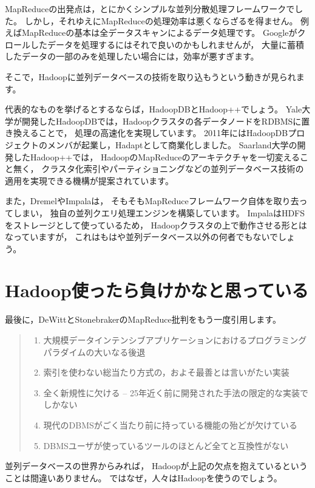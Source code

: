 MapReduceの出発点は，とにかくシンプルな並列分散処理フレームワークでした。
しかし，それゆえにMapReduceの処理効率は悪くならざるを得ません。
例えばMapReduceの基本は全データスキャンによるデータ処理です。
Googleがクロールしたデータを処理するにはそれで良いのかもしれませんが，
大量に蓄積したデータの一部のみを処理したい場合には，効率が悪すぎます。

そこで，Hadoopに並列データベースの技術を取り込もうという動きが見られます。

代表的なものを挙げるとするならば，HadoopDBとHadoop++でしょう。
Yale大学が開発したHadoopDBでは，Hadoopクラスタの各データノードをRDBMSに置き換えることで，
処理の高速化を実現しています。
2011年にはHadoopDBプロジェクトのメンバが起業し，Hadaptとして商業化しました。
Saarland大学の開発したHadoop++では，
HadoopのMapReduceのアーキテクチャを一切変えること無く，
クラスタ化索引やパーティショニングなどの並列データベース技術の適用を実現できる機構が提案されています。

また，DremelやImpalaは，
そもそもMapReduceフレームワーク自体を取り去ってしまい，
独自の並列クエリ処理エンジンを構築しています。
ImpalaはHDFSをストレージとして使っているため，
Hadoopクラスタの上で動作させる形とはなっていますが，
これはもはや並列データベース以外の何者でもないでしょう。

\section{Hadoop使ったら負けかなと思っている}

最後に，DeWittとStonebrakerのMapReduce批判をもう一度引用します。

\begin{quote}
\begin{enumerate}
 \item 大規模データインテンシブアプリケーションにおけるプログラミングパラダイムの大いなる後退
 \item 索引を使わない総当たり方式の，およそ最善とは言いがたい実装
 \item 全く新規性に欠ける -- 25年近く前に開発された手法の限定的な実装でしかない
 \item 現代のDBMSがごく当たり前に持っている機能の殆どが欠けている
 \item DBMSユーザが使っているツールのほとんど全てと互換性がない
\end{enumerate}
\end{quote}

並列データベースの世界からみれば，
Hadoopが上記の欠点を抱えているということは間違いありません。
ではなぜ，人々はHadoopを使うのでしょう。

